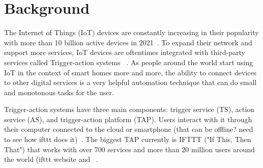 \section{Background}
\label{sec:background}

The Internet of Things (IoT) devices are constantly increasing in their popularity with more than 10 billion
active devices in 2021~\cite{DBLP:webpage/Bojan/IoTstats}. To expand their network and support more
services, IoT devices are oftentimes integrated with third-party services called Trigger-action systems
~\cite{DBLP:journals/access/XuZZCDG19}. As people around the world start using IoT in the
context of smart homes more and more, the ability to connect devices to other digital services is a very
helpful automation technique that can do small and monotonous tasks for the user. 

Trigger-action systems have three main components: trigger service (TS), action service (AS), and
trigger-action platform (TAP). Users interact with it through their computer connected to the cloud or
smartphone (that can be offline? need to see how ifttt does it)~\cite{DBLP:conf/sp/ChenCWSCF21}. The
biggest TAP currently is IFTTT ("If This, Then That") that works with over 700 services and more than 20
million users around the world (ifttt website and ~\cite{DBLP:conf/sp/ChenCWSCF21}. 